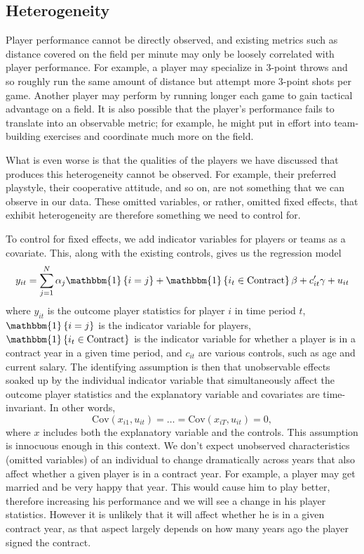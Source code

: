 \documentclass[12pt]{article}
\begin{document}
	\subsection{Heterogeneity}
	
	Player performance cannot be directly observed, and existing metrics such as distance covered on the field per minute may only be loosely correlated with player performance. For example, a player may specialize in 3-point throws and so roughly run the same amount of distance but attempt more 3-point shots per game. Another player may perform by running longer each game to gain tactical advantage on a field. It is also possible that the player's performance fails to translate into an observable metric; for example, he might put in effort into team-building exercises and coordinate much more on the field.
	
	What is even worse is that the qualities of the players we have discussed that produces this heterogeneity cannot be observed. For example, their preferred playstyle, their cooperative attitude, and so on, are not something that we can observe in our data. These omitted variables, or rather, omitted fixed effects, that exhibit heterogeneity are therefore something we need to control for.
	
	To control for fixed effects, we add indicator variables for players or teams as a covariate. This, along with the existing controls, gives us the regression model \[
	y_{it} = \sum_{j=1}^N \alpha_j \mathbbm{1}\left\lbrace i= j \right\rbrace + \mathbbm{1}\left\lbrace i_t\in \mathrm{Contract} \right\rbrace\beta + c_{it}'\gamma + u_{it}
	\] where $y_{it}$ is the outcome player statistics for player $i$ in time period $t$, $\mathbbm{1}\left\lbrace i= j \right\rbrace$ is the indicator variable for players, $\mathbbm{1}\left\lbrace i_t\in \mathrm{Contract} \right\rbrace$ is the indicator variable for whether a player is in a contract year in a given time period, and $c_{it}$ are various controls, such as age and current salary. The identifying assumption is then that unobservable effects soaked up by the individual indicator variable that simultaneously affect the outcome player statistics and the explanatory variable and covariates are time-invariant. In other words, \[
	\mathrm{Cov}\left(x_{i1}, u_{it}\right) = \dots = \mathrm{Cov}\left(x_{iT}, u_{it}\right) = 0,
	\] where $x$ includes both the explanatory variable and the controls. This assumption is innocuous enough in this context. We don't expect unobserved characteristics (omitted variables) of an individual to change dramatically across years that also affect whether a given player is in a contract year. For example, a player may get married and be very happy that year. This would cause him to play better, therefore increasing his performance and we will see a change in his player statistics. However it is unlikely that it will affect whether he is in a given contract year, as that aspect largely depends on how many years ago the player signed the contract.
	
\end{document}
